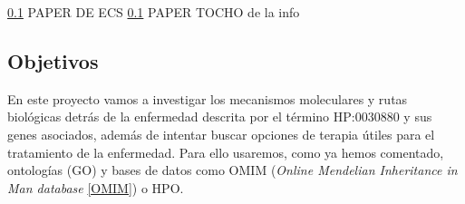\ref{} PAPER DE ECS
\ref{} PAPER TOCHO de la info

\subsection{Objetivos}

En este proyecto vamos a investigar los mecanismos moleculares y rutas biológicas detrás de la enfermedad descrita por el término HP:0030880 y sus genes asociados, además de intentar buscar opciones de terapia útiles para el tratamiento de la enfermedad. Para ello usaremos, como ya hemos comentado, ontologías (GO) y bases de datos como OMIM (\textit{Online Mendelian Inheritance in Man database} \ref{OMIM}) o HPO.

